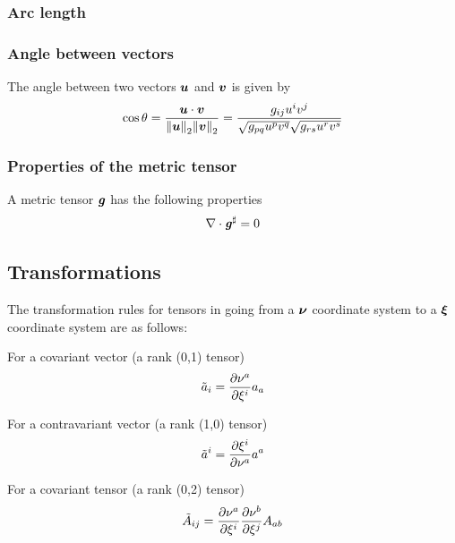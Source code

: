 \subsubsection{Arc length}

\subsubsection{Angle between vectors}

The angle between two vectors $\boldsymbol{u}$ and $\boldsymbol{v}$ is given by
\begin{equation}
  \cos\theta=\dfrac{\dotprod{\vectr{u}}{\vectr{v}}}{\norm{\vectr{u}}\norm{\vectr{v}}}=
  \dfrac{g_{ij}u^{i}v^{j}}{\sqrt{g_{pq}u^{p}v^{q}}\sqrt{g_{rs}u^{r}v^{s}}}
  \label{eqn:AngleBetweenVectors}
\end{equation}

\subsubsection{Properties of the metric tensor}

A metric tensor $\boldsymbol{\mathit{g}}$ has the following properties
\begin{align}
  \divergence{}{\sharptensor{\tensor{g}}}=0
  \label{eqn:DivergenceSharpMetricTensor}
\end{align}

\subsection{Transformations}

The transformation rules for tensors in going from a $\boldsymbol{\nu}$ coordinate
system to a $\boldsymbol{\xi}$ coordinate system are as follows: 


For a covariant vector (a rank (0,1) tensor)
\begin{equation}
  {\tilde{a}}_{i}= \dfrac{\partial \nu^{a}}{\partial \xi^{i}} a_{a}
\end{equation}

For a contravariant vector (a rank (1,0) tensor)
\begin{equation}
  {\tilde{a}}^{i}= \dfrac{\partial \xi^{i}}{\partial \nu^{a}} a^{a}
\end{equation}

For a covariant tensor (a rank (0,2) tensor)
\begin{equation}
  {\tilde{A}}_{ij}= \dfrac{\partial \nu^{a}}{\partial \xi^{i}}  \dfrac{\partial \nu^{b}}{\partial \xi^{j}} A_{ab} 
\end{equation}


